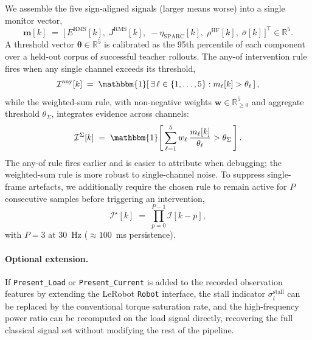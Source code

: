 We assemble the five sign-aligned signals (larger means worse) into a single
monitor vector,
\begin{equation}
    \mathbf{m}[k] \;=\; \big[\, E^{\mathrm{RMS}}[k], \; J^{\mathrm{RMS}}[k], \; -\eta_{\mathrm{SPARC}}[k], \; \rho^{\mathrm{HF}}[k], \; \bar{\sigma}[k] \,\big]^\top \in \mathbb{R}^5.
\end{equation}
A threshold vector $\bm{\theta} \in \mathbb{R}^5$ is calibrated as the 95th
percentile of each component over a held-out corpus of successful teacher
rollouts. The any-of intervention rule fires when any single channel
exceeds its threshold,
\begin{equation}
    \mathcal{I}^{\mathrm{any}}[k]
    \;=\;
    \mathbbm{1}\!\left[\, \exists\, \ell \in \{1,\ldots,5\} : m_\ell[k] > \theta_\ell \,\right],
\end{equation}
while the weighted-sum rule, with non-negative weights
$\mathbf{w} \in \mathbb{R}_{\ge 0}^{5}$ and aggregate threshold
$\theta_{\Sigma}$, integrates evidence across channels:
\begin{equation}
    \mathcal{I}^{\Sigma}[k]
    \;=\;
    \mathbbm{1}\!\left[\, \sum_{\ell=1}^{5} w_\ell \, \frac{m_\ell[k]}{\theta_\ell} > \theta_{\Sigma} \,\right].
\end{equation}
The any-of rule fires earlier and is easier to attribute when debugging; the
weighted-sum rule is more robust to single-channel noise. To suppress
single-frame artefacts, we additionally require the chosen rule to remain
active for $P$ consecutive samples before triggering an intervention,
\begin{equation}
    \mathcal{I}^{\star}[k] \;=\; \prod_{p = 0}^{P-1} \mathcal{I}[k - p],
\end{equation}
with $P = 3$ at 30~Hz ($\approx 100$~ms persistence).

\paragraph{Optional extension.} If \texttt{Present\_Load} or
\texttt{Present\_Current} is added to the recorded observation features by
extending the LeRobot \texttt{Robot} interface, the stall indicator
$\sigma_i^{\mathrm{stall}}$ can be replaced by the conventional torque
saturation rate, and the high-frequency power ratio can be recomputed on the
load signal directly, recovering the full classical signal set without
modifying the rest of the pipeline.
